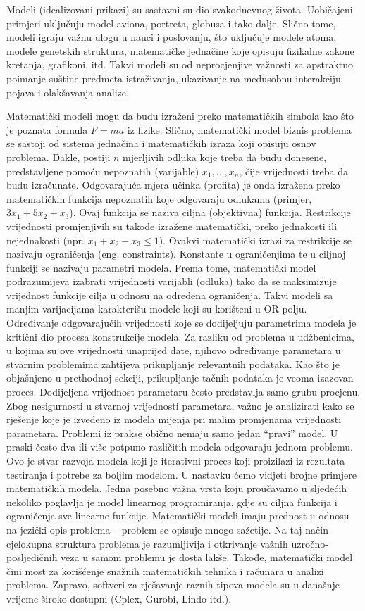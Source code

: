 \documentclass[a4paper, utf8, 11pt, colorlinks]{article}
\begin{document}
Modeli (idealizovani prikazi) su sastavni su dio svakodnevnog života. Uobičajeni 
primjeri uključuju model aviona, portreta, globusa i tako dalje. Slično tome, modeli igraju
važnu ulogu u nauci i poslovanju, što uključuje modele atoma, modele 
genetskih struktura, matematičke jednačine koje opisuju fizikalne zakone kretanja, grafikoni, itd. Takvi modeli
su od neprocjenjive važnosti za apstraktno poimanje suštine predmeta istraživanja, ukazivanje na međusobnu interakciju pojava i olakšavanja analize. 

Matematički modeli mogu da budu izraženi preko matematičkih simbola kao što je poznata formula $F=ma$ iz fizike. Slično, matematički model biznis problema   
se sastoji od sistema jednačina i matematičkih izraza koji opisuju osnov problema. Dakle, postiji $n$ mjerljivih odluka koje treba da budu donesene, predstavljene pomoću nepoznatih (varijable) $x_1,\ldots, x_n$, čije vrijednosti treba da budu izračunate.  Odgovarajuća mjera učinka (profita) je onda izražena preko matematičkih funkcija nepoznatih koje odgovaraju  odlukama (primjer, $3x_1 + 5x_2 + x_3$). Ovaj funkcija se naziva ciljna (objektivna) funkcija. Restrikcije  vrijednosti promjenjivih su takođe izražene matematički, preko jednakosti ili nejednakosti (npr. $x_1 + x_2 + x_3 \leq 1$).  Ovakvi matematički izrazi za restrikcije se nazivaju ograničenja (eng. constraints). Konstante u ograničenjima te u ciljnoj funkciji se nazivaju parametri modela. Prema tome, matematički model 
podrazumijeva izabrati vrijednosti varijabli (odluka) tako da se maksimizuje vrijednost funkcije cilja u odnosu na određena ograničenja. Takvi modeli sa manjim varijacijama karakterišu  modele koji su korišteni u OR polju. 
Određivanje odgovarajućih vrijednosti koje se dodijeljuju parametrima modela je kritični dio procesa konstrukcije modela.
Za razliku od problema u udžbenicima, u kojima su ove vrijednosti unaprijed date, njihovo određivanje parametara u stvarnim problemima zahtijeva prikupljanje relevantnih podataka. Kao što je objašnjeno u prethodnoj sekciji,  prikupljanje tačnih podataka je veoma izazovan proces.  Dodijeljena vrijednost parametaru često predstavlja  samo grubu procjenu. Zbog nesigurnosti u  stvarnoj vrijednosti parametara, važno je analizirati kako se rješenje koje je izvedeno iz modela mijenja pri malim promjenama vrijednosti parametara. 
 Problemi iz prakse obično nemaju samo jedan ``pravi'' model.  U praski   često   dva ili više potpuno različitih modela odgovaraju jednom problemu. 
Ovo je stvar razvoja modela koji je iterativni proces koji proizilazi iz rezultata testiranja i potrebe za boljim modelom.  
 U nastavku ćemo vidjeti brojne primjere matematičkih modela. Jedna posebno važna vrsta koju proučavamo u sljedećih nekoliko poglavlja
je model linearnog programiranja, gdje su ciljna funkcija i ograničenja   sve linearne funkcije. 
Matematički modeli imaju prednost u odnosu na jezički opis problema -- problem se opisuje mnogo sažetije. Na taj način cjelokupna struktura problema je razumljivija i otkrivanje važnih uzročno-posljedičnih veza u samom problemu je dosta lakše. Takođe, matematički
model čini most za korišćenje snažnih matematičkih tehnika i računara u
analizi problema. Zapravo, softveri za rješavanje raznih tipova modela su  u današnje vrijeme  široko dostupni (Cplex, Gurobi, Lindo itd.). 
\end{document}
